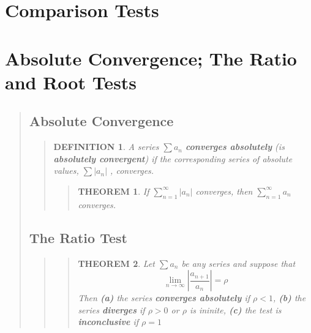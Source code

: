\documentclass{report}
\newtheorem{theorem}{THEOREM}
\newtheorem*{definition}{DEFINITION}
\begin{document}
\section{Comparison Tests }
\begin{quote}

\end{quote}


\section{Absolute Convergence; The Ratio and Root Tests }
\begin{quote}

		\subsection{Absolute Convergence}
		\begin{quote}

			\begin{definition}
				A series $\sum a_n$ \textbf{converges absolutely} (is \textbf{absolutely convergent})  if the corresponding series of absolute values, $\sum \left | a_n \right |$ , converges.
			\end{definition}

			\begin{quote}

				\begin{theorem}
					If $\sum_{n=1}^{\infty} \left | a_n \right | $ converges, then $ \sum_{n=1}^{\infty} a_n $ converges.
				\end{theorem}

			\end{quote}

		\end{quote}

	\subsection{The Ratio Test}
	\begin{quote}

		\begin{quote}
		\begin{theorem}
			Let $ \sum a_n $ be any series and suppose that
			$$\lim_{n \to \infty} \left | \frac{a_{n+1}}{a_n} \right | = \rho $$
			Then \textbf{(a)} the series \textbf{converges absolutely} if $\rho < 1$, \textbf{(b)} the series \textbf{diverges} if $ \rho > 0 $ or $\rho$ is ininite, \textbf{(c)} the test is \textbf{inconclusive} if $\rho = 1$
		\end{theorem}
		\end{quote}


\end{quote}
\end{quote}
\end{document}

